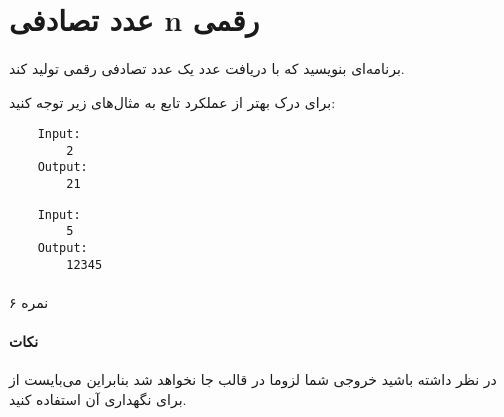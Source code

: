 \documentclass[../main.tex]{subfiles}
\begin{document}
\section{عدد تصادفی n رقمی}
\paragraph{}
برنامه‌ای بنویسید که با دریافت عدد
یک عدد تصادفی
رقمی تولید کند.

برای درک بهتر از عملکرد تابع به مثال‌های زیر توجه کنید:

\begin{latin}
\begin{verbatim}
    Input:
        2
    Output:
        21
\end{verbatim}

\begin{verbatim}
    Input:
        5
    Output:
        12345
\end{verbatim}
\end{latin}


\paragraph{}
۶ نمره

\paragraph{نکات}
در نظر داشته باشید خروجی شما لزوما در قالب
جا نخواهد شد بنابراین می‌بایست از
برای نگهداری آن استفاده کنید.
\end{document}
